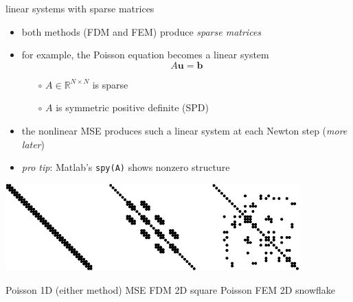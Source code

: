 \documentclass[hide notes,intlimits,usenames,dvipsnames]{beamer}
\newcommand{\RR}{\mathbb{R}}
\newcommand{\bb}{\mathbf{b}}
\newcommand{\bu}{\mathbf{u}}
\begin{document}
\begin{frame}{linear systems with sparse matrices}
\begin{itemize}
\item both methods (FDM and FEM) produce \emph{sparse matrices}
\item for example, the Poisson equation becomes a linear system
    $$A \bu = \bb$$
    \vspace{-4mm}
	\begin{itemize}
	\item[$\circ$] $A\in\RR^{N\times N}$ is sparse
	\item[$\circ$] $A$ is symmetric positive definite (SPD)
	\end{itemize}
\item the nonlinear MSE produces such a linear system at each Newton step (\emph{more later})
\item \emph{pro tip}: Matlab's \texttt{spy(A)} shows nonzero structure
\end{itemize}

\bigskip
\begin{center}
\includegraphics[width=0.85\textwidth]{figs/spythree}

\scriptsize
Poisson 1D (either method) \quad MSE FDM 2D square \qquad Poisson FEM 2D snowflake

\end{center}
\end{frame}
\end{document}
